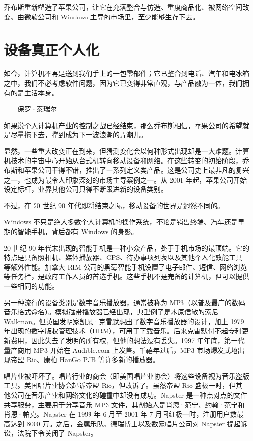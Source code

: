 \documentclass[12pt,UTF8]{ctexbook}
\begin{document}
乔布斯重新塑造了苹果公司，让它在充满整合与仿造、重度商品化、被网络空间改变、由微软公司和 Windows 主导的市场里，至少能够生存下去。





\section{设备真正个人化}


如今，计算机不再是送到我们手上的一包零部件；它已整合到电话、汽车和电冰箱之中，我们不必考虑软件问题，因为它已变得非常直观，与产品融为一体，我们拥有的是生活本身。

——保罗·泰瑞尔



如果说个人计算机产业的控制之战已经结束，那么乔布斯相信，苹果公司的希望就是尽量拖下去，撑到成为下一波浪潮的弄潮儿。

显然，一些重大改变正在到来，但猜测变化会以何种形式出现却是一大难题。计算机技术的宇宙中心开始从台式机转向移动设备和网络。在这些转变的初始阶段，乔布斯和苹果公司干得不错，推出了一系列定义类产品。这是公司史上最非凡的复兴之一，也成为最令人印象深刻的市场主导案例之一。从 2001 年起，苹果公司开始设定标杆，业界其他公司只得不断跟进新的设备类别。

不过，在 20 世纪 90 年代即将结束之际，移动设备的世界是迥然不同的。

Windows 不只是绝大多数个人计算机的操作系统，不论是销售终端、汽车还是早期的智能手机，背后都有 Windows 的身影。

20 世纪 90 年代末出现的智能手机是一种小众产品，处于手机市场的最顶端。它的特点是具备照相机、媒体播放器、GPS、待办事项列表以及其他个人化效能工具等额外性能。加拿大 RIM 公司的黑莓智能手机设置了电子邮件、短信、网络浏览等任务栏，是政府工作人员的首选手机。这些手机不是完备的计算机，但可以提供一些相同的功能。

另一种流行的设备类别是数字音乐播放器，通常被称为 MP3（以普及最广的数码音乐格式命名）。模拟磁带播放器已经出现，典型例子是木原信敏的索尼 Walkman。但英国发明家凯恩·克雷默想出了数字音乐播放器的设计，加上 1979 年出现的数字版权管理技术（DRM），可用于下载音乐。后来克雷默付不起专利更新费用，因此失去了发明的所有权，但他的想法没有丢失。1997 年年底，第一代量产商用 MP3 开始在 Audible.com 上发售。千禧年过后，MP3 市场爆发式地出现帝盟 Rio、康柏 HanGo PJB 等许多新的播放器。

唱片业被吓坏了。唱片行业的商会（即美国唱片业协会）将这些设备视为音乐盗版工具。美国唱片业协会起诉帝盟 Rio，但败诉了。虽然帝盟 Rio 盛极一时，但其他公司在音乐产业和网络文化的碰撞中却没有成功。Napster 是一种点对点的文件共享服务，主要用于分享音乐 MP3 文件，其创始人是肖恩·范宁、约翰·范宁和肖恩·帕克。Napster 在 1999 年 6 月至 2001 年 7 月间红极一时，注册用户数最高达到 8000 万。之后，金属乐队、德瑞博士以及数家唱片公司对 Napster 提起诉讼，法院下令关闭了 Napster。
\end{document}
